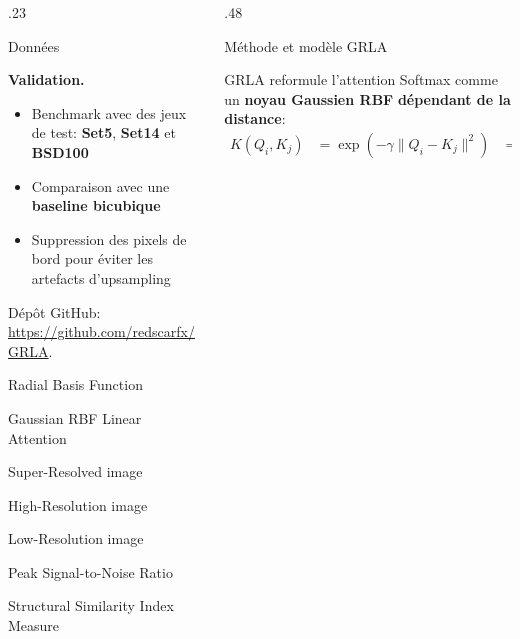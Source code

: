 \documentclass{beamer}
\newcommand{\highlight}[1]{\textcolor{iclrblue}{\textbf{#1}}}
\begin{document}
\begin{frame}
\begin{columns}[T]
\begin{column}{.23\textwidth}
\begin{minipage}[t][\textheight][t]{\linewidth}
\begin{block}{Données}
\par\vspace{1em}

\highlight{Validation.}
\par\vspace{0.2em}
\begin{itemize}
    \item Benchmark avec des jeux de test: 
    \textbf{Set5}, \textbf{Set14} et \textbf{BSD100}
    \item Comparaison avec une \textbf{baseline bicubique}
    \item Suppression des {pixels de bord} pour éviter les artefacts d’upsampling
\end{itemize}

\par\vspace{1em}
Dépôt GitHub: \url{https://github.com/redscarfx/GRLA}.


\end{block}
\vfill
\hline
\vspace{0.4em}
\begin{description}[leftmargin=!]
\item[\highlight{RBF}] Radial Basis Function
\item[\highlight{GRLA/GRBFLA}] Gaussian RBF Linear Attention
\item[\highlight{SR}] Super-Resolved image
\item[\highlight{HR}] High-Resolution image
\item[\highlight{LR}] Low-Resolution image
\item[\highlight{PSNR}] Peak Signal-to-Noise Ratio
\item[\highlight{SSIM}] Structural Similarity Index Measure

\item[ ] 
\item[ ]
\end{description}

\end{minipage}





\end{column}

\begin{column}{.48\textwidth}

\begin{block}{Méthode et modèle GRLA}

GRLA reformule l’attention Softmax comme un \textbf{noyau Gaussien RBF} \textbf{dépendant de la distance}:
\[
\begin{aligned}
K(Q_i, K_j)
&= \exp\!\left(-\gamma \|Q_i - K_j\|^2\right) 
&= \exp(-\gamma\|Q_i\|^2)\,
   \exp(-\gamma\|K_j\|^2)\,
   \exp(2\gamma Q_i^\top K_j).
\end{aligned}
\]




\end{block}
\end{column}
\end{columns}
\end{frame}
\end{document}
